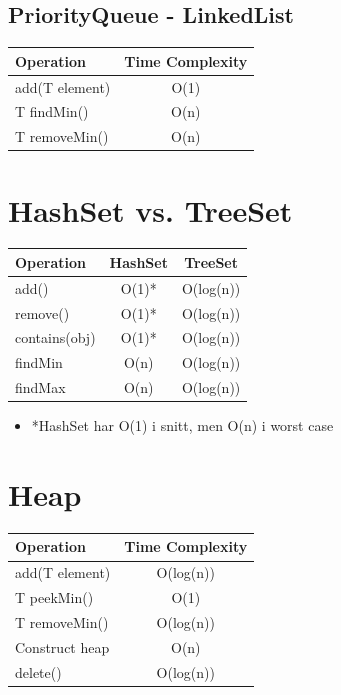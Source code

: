 \documentclass{article}
\begin{document}
\subsection{PriorityQueue - LinkedList}
\begin{table}[!ht]
\centering
\begin{tabular}{|l|c|}
\hline
\textbf{Operation} & \textbf{Time Complexity} \\
\hline
add(T element) & O(1) \\
\hline
T findMin() & O(n) \\
\hline
T removeMin() & O(n) \\
\hline
\end{tabular}
\end{table}

\newpage


\section{HashSet vs. TreeSet}
\begin{table}[!ht]
\centering
\begin{tabular}{|l|c|c|}
\hline
\textbf{Operation} & \textbf{HashSet} & \textbf{TreeSet} \\
\hline
add() & O(1)* & O(log(n)) \\
\hline
remove() & O(1)* & O(log(n)) \\
\hline
contains(obj) & O(1)* & O(log(n)) \\
\hline
findMin & O(n) & O(log(n))\\
\hline
findMax & O(n) & O(log(n))\\
\hline
\end{tabular}
\end{table}
\begin{itemize}
  \item *HashSet har O(1) i snitt, men O(n) i worst case
\end{itemize}



\section{Heap}

\begin{table}[!ht]
\centering
\begin{tabular}{|l|c|}
\hline
\textbf{Operation} & \textbf{Time Complexity} \\
\hline
add(T element) & O(log(n)) \\
\hline
T peekMin() & O(1) \\
\hline
T removeMin() & O(log(n)) \\
\hline
Construct heap & O(n) \\
\hline
delete() & O(log(n)) \\
\hline
\end{tabular}
\end{table}
\end{document}
